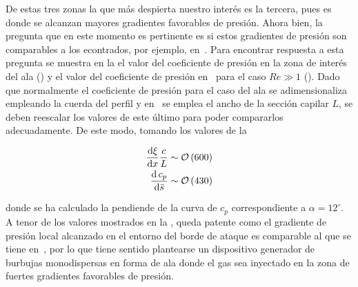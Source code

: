 De estas tres zonas la que más despierta nuestro interés es la tercera, pues es donde se alcanzan mayores gradientes favorables de presión. Ahora bien, la pregunta que en este momento es pertinente es si estos gradientes de presión son comparables a los econtrados, por ejemplo, en~\cite{Evangelio2015b}. Para encontrar respuesta a esta pregunta se muestra en la  el valor del coeficiente de presión en la zona de interés del ala () y el valor del coeficiente de presión en~\cite{Evangelio2015b} para el caso $Re \gg 1$ (). Dado que normalmente el coeficiente de presión para el caso del ala se adimensionaliza empleando la cuerda del perfil y en~\cite{Evangelio2015b} se emplea el ancho de la sección capilar $L$, se deben reescalar los valores de este último para poder compararlos adecuadamente. De este modo, tomando los valores de la 

\begin{align}
\dfrac{\mathrm{d}\xi}{\mathrm{d}x}\dfrac{c}{L} & \sim \mathcal{O}\left(600\right) \\
\dfrac{\mathrm{d}\,c_{p}}{\mathrm{d}\bar{s}} & \sim \mathcal{O}\left(430\right) 
\LABEQ{gradPresComp}
\end{align}

donde se ha calculado la pendiende de la curva de $c_{p}$ correspondiente a $\alpha = 12^{\circ}$. A tenor de los valores mostrados en la , queda patente como el gradiente de presión local alcanzado en el entorno del borde de ataque es comparable al que se tiene en~\cite{Evangelio2015b}, por lo que tiene sentido plantearse un dispositivo generador de burbujas monodispersas en forma de ala donde el gas sea inyectado en la zona de fuertes gradientes favorables de presión. 

